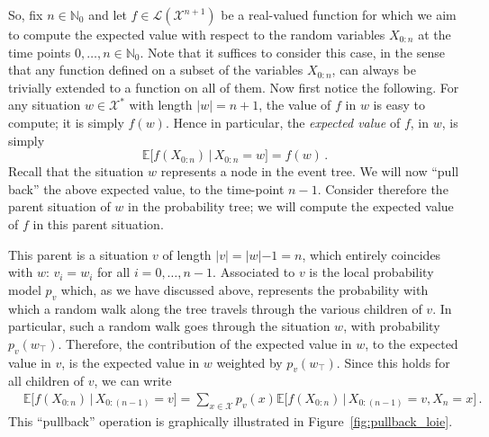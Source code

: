 \documentclass[graybox]{svmult}
\newcommand{\nats}{\mathbb{N}}
\newcommand{\natswith}{\nats_{0}}
\newcommand{\states}{\mathcal{X}}
\newcommand{\gambles}{\mathcal{L}}
\begin{document}
So, fix $n\in\natswith$ and let $f\in\gambles(\states^{n+1})$ be a real-valued function for which we aim to compute the expected value with respect to the random variables $X_{0:n}$ at the time points $0,\ldots,n\in\natswith$. Note that it suffices to consider this case, in the sense that any function defined on a subset of the variables $X_{0:n}$, can always be trivially extended to a function on all of them. Now first notice the following. For any situation $w\in\states^*$ with length $\lvert w\rvert = n+1$, the value of $f$ in $w$ is easy to compute; it is simply $f(w)$. Hence in particular, the \emph{expected value} of $f$, in $w$, is simply
\begin{equation*}
\mathbb{E}\bigl[f(X_{0:n})\,\big\vert\,X_{0:n}=w\bigr] = f(w)\,.
\end{equation*}
Recall that the situation $w$ represents a node in the event tree. We will now ``pull back'' the above expected value, to the time-point $n-1$. Consider therefore the parent situation of $w$ in the probability tree; we will compute the expected value of $f$ in this parent situation.

This parent is a situation $v$ of length $\lvert v\lvert=\lvert w\lvert-1=n$, which entirely coincides with $w$: $v_i=w_i$ for all $i=0,\ldots,n-1$. Associated to $v$ is the local probability model $p_v$ which, as we have discussed above, represents the probability with which a random walk along the tree travels through the various children of $v$. In particular, such a random walk goes through the situation $w$, with probability $p_v(w_\top)$. Therefore, the contribution of the expected value in $w$, to the expected value in $v$, is the expected value in $w$ weighted by $p_v(w_\top)$. Since this holds for all children of $v$, we can write
\begin{align*}
&\mathbb{E}\bigl[f(X_{0:n}) \,\big\vert\, X_{0:(n-1)}=v \bigr] = \sum_{x\in\states} p_v(x)\mathbb{E}\bigl[f(X_{0:n})\,\big\vert\,X_{0:(n-1)}=v,X_n=x\bigr]\,.
\end{align*}
This ``pullback'' operation is graphically illustrated in Figure~\ref{fig:pullback_loie}.
\end{document}
